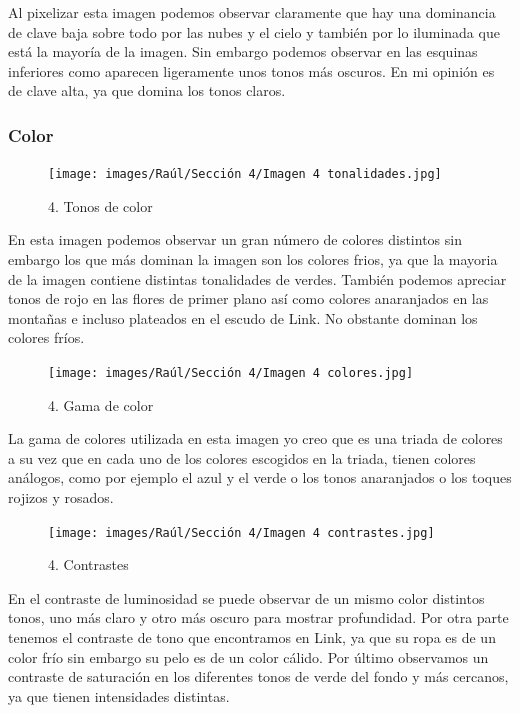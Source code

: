 \documentclass[12pt]{article}
\begin{document}
Al pixelizar esta imagen podemos observar claramente que hay una dominancia de clave baja sobre todo por las nubes y el cielo y también por lo iluminada que está la mayoría de la imagen. Sin embargo podemos observar en las esquinas inferiores como aparecen ligeramente unos tonos más oscuros. En mi opinión es de clave alta, ya que domina los tonos claros.


        \subsubsection{Color}

\begin{figure}[H]
      \centering
      \texttt{[image: images/Raúl/Sección 4/Imagen 4 tonalidades.jpg]}
      \caption{\small 4. Tonos de color}
\end{figure}
En esta imagen podemos observar un gran número de colores distintos sin embargo los que más dominan la imagen son los colores frios, ya que la mayoria de la imagen contiene distintas tonalidades de verdes. También podemos apreciar tonos de rojo en las flores de primer plano así como colores anaranjados en las montañas e incluso plateados en el escudo de Link. No obstante dominan los colores fríos.

\begin{figure}[H]
      \centering
      \texttt{[image: images/Raúl/Sección 4/Imagen 4 colores.jpg]}
      \caption{\small 4. Gama de color}
\end{figure}

La gama de colores utilizada en esta imagen yo creo que es una triada de colores a su vez que en cada uno de los colores escogidos en la triada, tienen colores análogos, como por ejemplo el azul y el verde o los tonos anaranjados o los toques rojizos y rosados.

\begin{figure}[H]
      \centering
      \texttt{[image: images/Raúl/Sección 4/Imagen 4 contrastes.jpg]}
      \caption{\small 4. Contrastes}
\end{figure}

En el contraste de luminosidad se puede observar de un mismo color distintos tonos, uno más claro y otro más oscuro para mostrar profundidad. Por otra parte tenemos el contraste de tono que encontramos en Link, ya que su ropa es de un color frío sin embargo su pelo es de un color cálido. Por último observamos un contraste de saturación en los diferentes tonos de verde del fondo y más cercanos, ya que tienen intensidades distintas.
\end{document}
